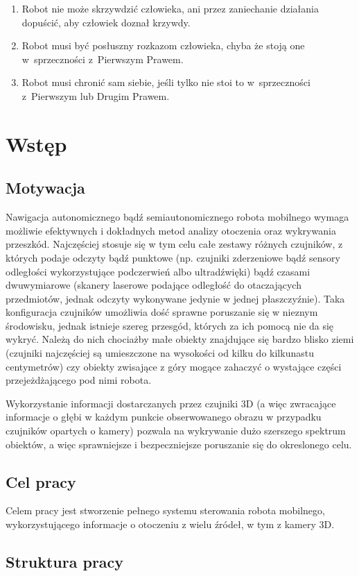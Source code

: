 

\begin{savequote}[80mm]
\begin{enumerate}
\item Robot nie może skrzywdzić człowieka, ani przez zaniechanie działania dopuścić, aby człowiek doznał krzywdy.\\
\item Robot musi być posłuszny rozkazom człowieka, chyba że stoją one w~sprzeczności z~Pierwszym Prawem.\\
\item Robot musi chronić sam siebie, jeśli tylko nie stoi to w~sprzeczności z~Pierwszym lub Drugim Prawem.\end{enumerate}
\end{savequote}


\chapter{Wstęp}
\label{chap:wstep}

\section{Motywacja}

Nawigacja autonomicznego bądź semiautonomicznego robota mobilnego wymaga możliwie
efektywnych i dokładnych metod analizy otoczenia oraz wykrywania przeszkód.
Najczęściej stosuje się w tym celu całe zestawy różnych czujników, z których
podaje odczyty bądź punktowe (np. czujniki zderzeniowe bądź sensory odległości
wykorzystujące podczerwień albo ultradźwięki) bądź czasami dwuwymiarowe (skanery
laserowe podające odległość do otaczających przedmiotów, jednak odczyty wykonywane
jedynie w jednej płaszczyźnie). Taka konfiguracja czujników umożliwia dość sprawne
poruszanie się w nieznym środowisku, jednak istnieje szereg przesgód, których za
ich pomocą nie da się wykryć. Należą do nich chociażby małe obiekty znajdujące
się bardzo blisko ziemi (czujniki najczęściej są umieszczone na wysokości od kilku
do kilkunastu centymetrów) czy obiekty zwisające z góry mogące zahaczyć o wystające
części przejeżdżającego pod nimi robota.

Wykorzystanie informacji dostarczanych przez czujniki 3D (a więc zwracające informacje
o głębi w każdym punkcie obserwowanego obrazu w przypadku czujników opartych o kamery)
pozwala na wykrywanie dużo szerszego spektrum obiektów, a więc sprawniejsze i bezpeczniejsze
poruszanie się do okreslonego celu.

\section{Cel pracy}

Celem pracy jest stworzenie pełnego systemu sterowania robota mobilnego,
wykorzystującego informacje o otoczeniu z wielu źródeł, w tym z kamery 3D.

\section{Struktura pracy}


